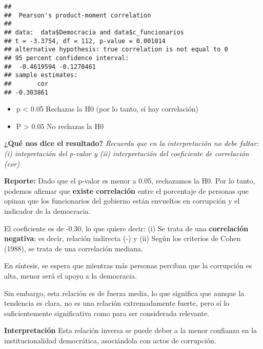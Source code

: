\documentclass[
]{article}
\newenvironment{Shaded}{\begin{snugshade}}{\end{snugshade}}
\newcommand{\CommentTok}[1]{\textcolor[rgb]{0.56,0.35,0.01}{\textit{#1}}}
\newcommand{\FunctionTok}[1]{\textcolor[rgb]{0.00,0.00,0.00}{#1}}
\newcommand{\NormalTok}[1]{#1}
\newcommand{\SpecialCharTok}[1]{\textcolor[rgb]{0.00,0.00,0.00}{#1}}
\providecommand{\tightlist}{%
  \setlength{\itemsep}{0pt}\setlength{\parskip}{0pt}}
\begin{document}
\begin{Shaded}
\end{Shaded}

\begin{verbatim}
## 
##  Pearson's product-moment correlation
## 
## data:  data$Democracia and data$c_funcionarios
## t = -3.3754, df = 112, p-value = 0.001014
## alternative hypothesis: true correlation is not equal to 0
## 95 percent confidence interval:
##  -0.4619594 -0.1270461
## sample estimates:
##       cor 
## -0.303861
\end{verbatim}

\begin{itemize}
\tightlist
\item
  p \textless{} 0.05 Rechazas la H0 (por lo tanto, sí hay correlación)
\item
  P \textgreater{} 0.05 No rechazas la H0
\end{itemize}

\textbf{¿Qué nos dice el resultado?} \emph{Recuerda que en la
interpretación no debe faltar: (i) intepretación del p-valor y (ii)
interpretación del coeficiente de correlación (cor)}

\textbf{Reporte:} Dado que el p-valor es menor a 0.05, rechazamos la H0.
Por lo tanto, podemos afirmar que \textbf{existe correlación} entre el
porcentaje de personas que opinan que los funcionarios del gobierno
están envueltos en corrupción y el indicador de la democracia.

El coeficiente es de -0.30, lo que quiere decir: (i) Se trata de una
\textbf{correlación negativa}; es decir, relación indirecta (-) y (ii)
Según los criterios de Cohen (1988), se trata de una correlación
mediana.

En síntesis, se espera que mientras más personas perciban que la
corrupción es alta, menor será el apoyo a la democracia.

Sin embargo, esta relación es de fuerza media, lo que significa que
aunque la tendencia es clara, no es una relación extremadamente fuerte,
pero sí lo suficientemente significativa como para ser considerada
relevante.

\textbf{Interpretación} Esta relación inversa se puede deber a la menor
confianza en la institucionalidad democrática, asociándola con actos de
corrupción.
\end{document}
